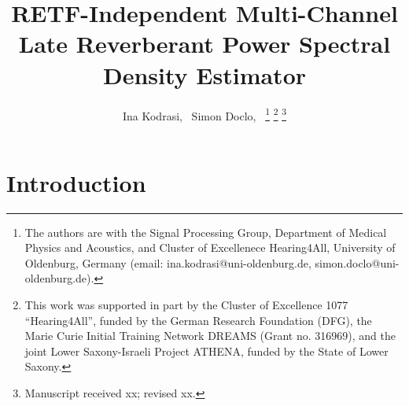 \documentclass[10pt]{IEEEtran}
\begin{document}
\newlength\figureheight
\newlength\figurewidth
\setlength\figureheight{2.3cm}
\setlength{}


\title{RETF-Independent Multi-Channel Late Reverberant Power Spectral Density Estimator}

\author{Ina Kodrasi,~
        Simon Doclo,~
\thanks{The authors are with the Signal Processing Group, Department of Medical Physics and Acoustics, and Cluster of Excellenece Hearing4All, University of Oldenburg, Germany (email: ina.kodrasi@uni-oldenburg.de, simon.doclo@uni-oldenburg.de).}%
\thanks{
This work was supported in part by the Cluster of Excellence 1077 ``Hearing4All'', funded by the German Research Foundation (DFG), the Marie Curie Initial Training Network DREAMS (Grant no. 316969), and the joint Lower Saxony-Israeli Project ATHENA, funded by the State of Lower Saxony.
}
\thanks{Manuscript received xx; revised xx.}}


\maketitle

\begin{abstract}
\end{abstract}

\begin{IEEEkeywords}
\end{IEEEkeywords}

\section{Introduction}

\end{document}
